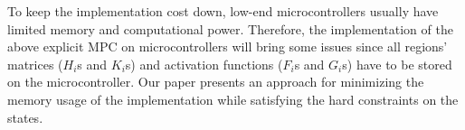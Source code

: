 To keep the implementation cost down, low-end microcontrollers usually have
limited memory and computational power. Therefore, the implementation of the above
explicit MPC on microcontrollers will bring some issues since all regions'
matrices ($H_i$s and $K_i$s) and activation functions ($F_i$s and $G_i$s) have
to be stored on the microcontroller. Our paper presents an
approach for minimizing the memory usage of the implementation while satisfying
the hard constraints on the states.

